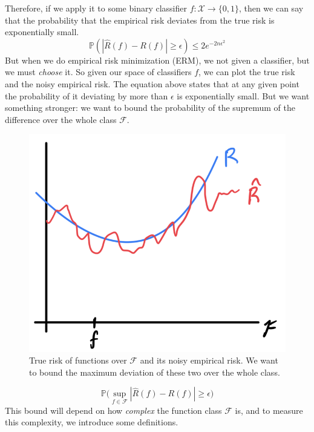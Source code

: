 \documentclass{article}
\begin{document}
    Therefore, if we apply it to some binary classifier $f: \mathcal{X} \rightarrow \{0, 1\}$, then we can say that the probability that the empirical risk deviates from the true risk is exponentially small. 
    \begin{equation}
      \mathbb{P} (|\hat{R} (f) - R(f)| \geq \epsilon) \leq 2e^{- 2 n \epsilon^2}
    \end{equation}
    But when we do empirical risk minimization (ERM), we not given a classifier, but we must \textit{choose} it. So given our space of classifiers $f$, we can plot the true risk and the noisy empirical risk. The equation above states that at any given point the probability of it deviating by more than $\epsilon$ is exponentially small. But we want something stronger: we want to bound the probability of the supremum of the difference over the whole class $\mathcal{F}$. 
    \begin{figure}[H]
      \centering 
      \includegraphics[scale=0.4]{img/True_vs_Empirical_Risk.png}
      \caption{True risk of functions over $\mathcal{F}$ and its noisy empirical risk. We want to bound the maximum deviation of these two over the whole class.} 
      \label{fig:true_vs_empirical_risk}
    \end{figure}
    \begin{equation}
      \mathbb{P} \big( \sup_{f \in \mathcal{F}} | \hat{R} (f) - R(f) | \geq \epsilon \big)
    \end{equation}
    This bound will depend on how \textit{complex} the function class $\mathcal{F}$ is, and to measure this complexity, we introduce some definitions. 
\end{document}
